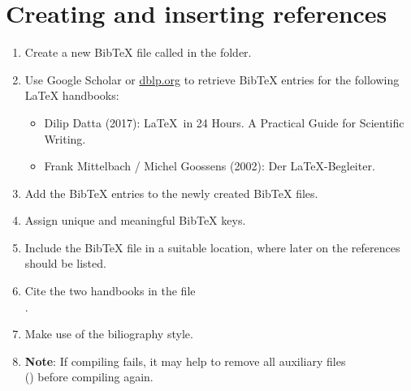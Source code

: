 \section{Creating and inserting references}

\begin{enumerate}
  \item Create a new Bib\TeX{} file called  in the  folder.
  \item Use Google Scholar or \url{dblp.org} to retrieve Bib\TeX{} entries for the following \LaTeX{}
  handbooks:
  \begin{itemize}
    \item Dilip Datta (2017): \LaTeX\ in 24 Hours. A Practical Guide for Scientific Writing.
    \item Frank Mittelbach / Michel Goossens (2002): Der \LaTeX-Begleiter.
  \end{itemize}
  \item Add the Bib\TeX{} entries to the newly created Bib\TeX{} files.
  \item Assign unique and meaningful Bib\TeX{} keys.
  \item Include the Bib\TeX{} file in a suitable location, where later on the references should be listed.
  \item Cite the two handbooks in the 
  file\\.
  \item Make use of the  biliography style.
  \item \textbf{Note}: If compiling fails, it may help to remove all auxiliary 
  files \\() before compiling again.
\end{enumerate}

